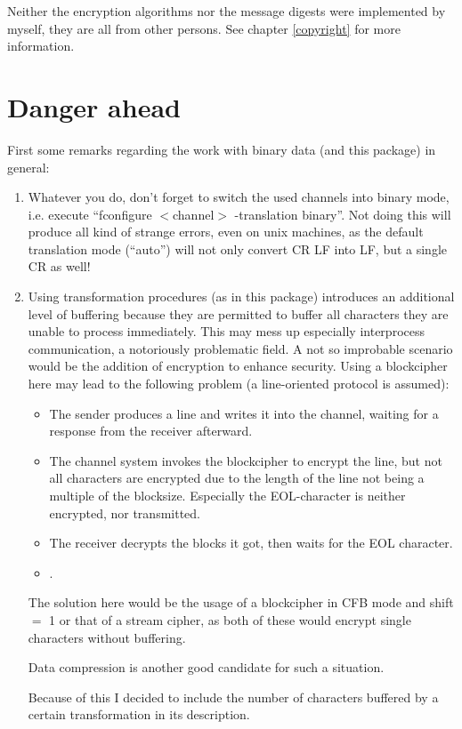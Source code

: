 \documentclass {report}
\begin{document}
Neither the encryption algorithms nor the message digests were
implemented by myself, they are all from other persons. See chapter
\ref {copyright} for more information.


\chapter {Danger ahead}

First some remarks regarding the work with binary data (and this
package) in general:

\begin {enumerate}
\item	Whatever you do, don't forget to switch the used channels into
	binary mode, i.e. execute ``fconfigure $<$channel$>$ -translation
	binary''. Not doing this will produce all kind of strange
	errors, even on unix machines, as the default translation mode
	(``auto'') will not only convert CR LF into LF, but a single
	CR as well!

\item	Using transformation procedures (as in this package)
	introduces an additional level of buffering because they are
	permitted to buffer all characters they are unable to process
	immediately. This may mess up especially
	interprocess communication, a notoriously problematic field. A
	not so improbable scenario would be the addition of encryption
	to enhance security. Using a blockcipher here may lead to the
	following problem (a line-oriented protocol is assumed):

	\begin {itemize}
	\item	The sender produces a line and writes it into the channel,
		waiting for a response from the receiver afterward.
	\item	The channel system invokes the blockcipher to encrypt
		the line, but not all characters are encrypted due to
		the length of the line not being a multiple of the
		blocksize. Especially the EOL-character is neither
		encrypted, nor transmitted.
	\item	The receiver decrypts the blocks it got, then waits
		for the EOL character.
	\item	{}.
	\end   {itemize}

	The solution here would be the usage of a blockcipher in CFB
	mode and shift $=$ 1 or that of a stream cipher, as both of these
	would encrypt single characters without buffering.

	Data compression is another good candidate for such a situation.

	Because of this I decided to include the number of characters
	buffered by a certain transformation in its description.

\end   {enumerate}
\end{document}
